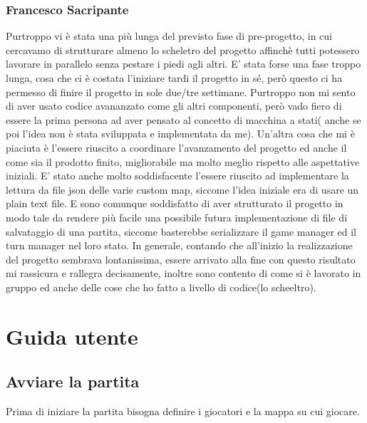 \documentclass[a4paper,12pt]{report}
\begin{document}
\subsection{Francesco Sacripante}
Purtroppo vi è stata una più lunga del previsto fase di pre-progetto, in cui cercavamo di strutturare almeno lo scheletro del progetto
affinchè tutti potessero lavorare in parallelo senza pestare i piedi agli altri.
E' stata forse una fase troppo lunga, cosa che ci è costata l'iniziare tardi il progetto in sé, però questo ci ha permesso di finire il progetto in sole due/tre settimane.
Purtroppo non mi sento di aver usato codice avananzato come gli altri componenti, però vado fiero di essere la prima persona ad aver pensato al concetto di macchina a stati( anche se poi l'idea non è stata sviluppata e implementata da me).
Un'altra cosa che mi è piaciuta è l'essere riuscito a coordinare l'avanzamento del progetto ed anche il come sia il prodotto finito, migliorabile ma molto meglio rispetto alle aspettative iniziali.
E' stato anche molto soddisfacente l'essere riuscito ad implementare la lettura da file json delle varie custom map, siccome l'idea iniziale era di usare un plain text file.
E sono comunque soddisfatto di aver strutturato il progetto in modo tale da rendere più facile una possibile futura implementazione di file di salvataggio di una partita, siccome basterebbe serializzare il game manager ed il turn manager nel loro stato.
In generale, contando che all'inizio la realizzazione del progetto sembrava lontanissima, essere arrivato alla fine con questo risultato mi rassicura e rallegra decisamente, inoltre sono contento di come si è lavorato in gruppo ed anche delle cose che ho fatto a livello di codice(lo scheeltro).

\appendix
\chapter{Guida utente}
\section{Avviare la partita}
Prima di iniziare la partita bisogna definire i giocatori e la mappa su cui giocare.
\end{document}
